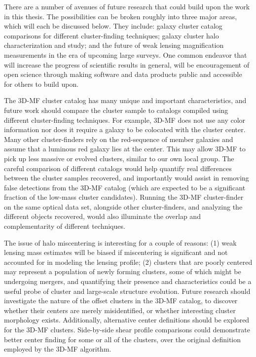 There are a number of avenues of future research that could build upon the work in this thesis. The possibilities can be broken roughly into three major areas, which will each be discussed below. They include: galaxy cluster catalog comparisons for different cluster-finding techniques; galaxy cluster halo characterization and study; and the future of weak lensing magnification measurements in the era of upcoming large surveys. One common endeavor that will increase the progress of scientific results in general, will be encouragement of open science through making software and data products public and accessible for others to build upon.

The \ac{3D-MF} cluster catalog has many unique and important characteristics, and future work should compare the cluster sample to catalogs compiled using different cluster-finding techniques. For example, \ac{3D-MF} does not use any color information nor does it require a galaxy to be colocated with the cluster center. Many other cluster-finders rely on the red-sequence of member galaxies and assume that a luminous red galaxy lies at the center. This may allow \ac{3D-MF} to pick up less massive or evolved clusters, similar to our own local group. The careful comparison of different catalogs would help quantify real differences between the cluster samples recovered, and importantly would assist in removing false detections from the \ac{3D-MF} catalog (which are expected to be a significant fraction of the low-mass cluster candidates). Running the \ac{3D-MF} cluster-finder on the same optical data set, alongside other cluster-finders, and analyzing the different objects recovered, would also illuminate the overlap and complementarity of different techniques.

The issue of halo miscentering is interesting for a couple of reasons: (1) weak lensing mass estimates will be biased if miscentering is significant and not accounted for in modeling the lensing profile; (2) clusters that are poorly centered may represent a population of newly forming clusters, some of which might be undergoing mergers, and quantifying their presence and characteristics could be a useful probe of cluster and large-scale structure evolution. Future research should investigate the nature of the offset clusters in the \ac{3D-MF} catalog, to discover whether their centers are merely misidentified, or whether interesting cluster morphology exists. Additionally, alternative center definitions should be explored for the \ac{3D-MF} clusters. Side-by-side shear profile comparisons could demonstrate better center finding for some or all of the clusters, over the original definition employed by the \ac{3D-MF} algorithm.


